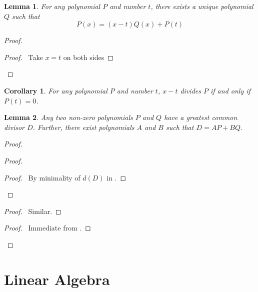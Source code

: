 \documentclass{book}
\let\qed\relax
\newtheorem{lm}{Lemma}[chapter]
\newtheorem{cor}{Corollary}[lm]
\theoremstyle{definition}
\begin{document}
  \begin{lm}
   For any polynomial $P$ and number $t$, there exists a unique polynomial $Q$ 
such that
\[ P(x) = (x - t) Q(x) + P(t) \]
  \end{lm}

  \begin{proof}
   \pf
    \begin{proof}
      \pf\ Take $x = t$ on both sides
    \end{proof}
    \qed
  \end{proof}

  \begin{cor}
   For any polynomial $P$ and number $t$, $x - t$ divides $P$ if and only if 
$P(t) = 0$.
  \end{cor}

  \begin{lm}
   Any two non-zero polynomials $P$ and $Q$ have a greatest common divisor $D$. 
Further, there exist polynomials $A$ and $B$ such that $D = AP + BQ$.
  \end{lm}

  \begin{proof}
    \begin{proof}
      \begin{proof}
        \pf\ By minimality of $d(D)$ in .
      \end{proof}
    \end{proof}
    \begin{proof}
      \pf\ Similar.
    \end{proof}
    \begin{proof}
      \pf\ Immediate from .
    \end{proof}
    \qed
  \end{proof}

  \chapter{Linear Algebra}
  
\end{document}
